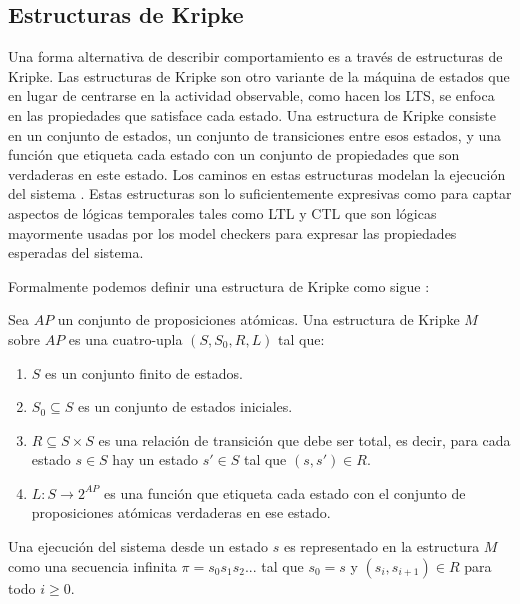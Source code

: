 \documentclass[titlepage, 12pt]{book}
\begin{document}
\subsection*{Estructuras de Kripke}
Una forma alternativa de describir comportamiento es a trav\'es de estructuras de Kripke. Las estructuras de Kripke son otro variante de la m\'aquina de estados que en lugar de centrarse en la actividad observable, como hacen los LTS, se enfoca en las propiedades que satisface cada estado. Una estructura de Kripke consiste en un conjunto de estados, un conjunto de transiciones entre esos estados, y una funci\'on que etiqueta cada estado con un conjunto de propiedades que son verdaderas en este estado. Los caminos en estas estructuras modelan la ejecuci\'on del sistema \cite{Clarke}. Estas estructuras son lo suficientemente expresivas como para captar aspectos de l\'ogicas temporales tales como LTL y CTL que son l\'ogicas mayormente usadas por los model checkers para expresar las propiedades esperadas del sistema.

Formalmente podemos definir una estructura de Kripke como sigue \cite{Clarke}:

Sea $AP$ un conjunto de proposiciones at\'omicas. Una estructura de Kripke $M$ sobre $AP$ es una cuatro-upla $(S,S_0,R,L)$ tal que:

\begin{enumerate}
\item $S$ es un conjunto finito de estados.
\item $S_0 \subseteq S$ es un conjunto de estados iniciales.
\item $R \subseteq S \times S$ es una relaci\'on de transici\'on que debe ser total, es decir, para cada estado $s \in S$ hay un estado $s' \in S$ tal que $(s,s') \in R$.
\item $L : S \rightarrow 2^{AP}$ es una funci\'on que etiqueta cada estado con el conjunto de proposiciones at\'omicas verdaderas en ese estado.
\end{enumerate}

Una ejecuci\'on del sistema desde un estado $s$ es representado en la estructura $M$ como una secuencia infinita $\pi = s_0s_1s_2...$ tal que $s_0 = s$ y $(s_i,s_{i+1})\in R$ para todo $i \geq 0$.
\end{document}
